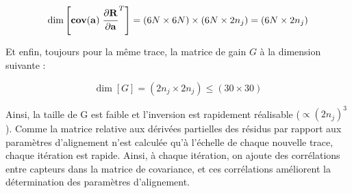 \begin{appendices}
%    
% 
%    
%    
   
   \begin{equation}
    \dim\left[\mathbf{cov(a)}\left.\cfrac{ \partial \mathbf{R} }{ \partial \mathbf{a} }\right.^T \right] = (6N \times 6N) \times (6N \times 2n_j) = (6N \times 2n_j)
   \end{equation}
   
   Et enfin, toujours pour la m\^eme trace, la matrice de gain $G$ \`a la dimension suivante : 
   
   \begin{equation}
    \dim[G] = (2n_j \times 2n_j) \leq (30 \times 30)
   \end{equation}
   
   Ainsi, la taille de G est faible et l'inversion est rapidement r\'ealisable ($\propto (2n_j)^{3}$). Comme la matrice relative aux d\'eriv\'ees partielles des r\'esidus par rapport aux param\`etres d'alignement n'est calcul\'ee qu'\`a l'\'echelle de chaque nouvelle trace, chaque it\'eration est rapide. Ainsi, \`a chaque it\'eration, on ajoute des corrélations entre capteurs dans la matrice de covariance, et ces corr\'elations am\'eliorent la d\'etermination des param\`etres d'alignement.   
   
   \medskip
   

\end{appendices}
